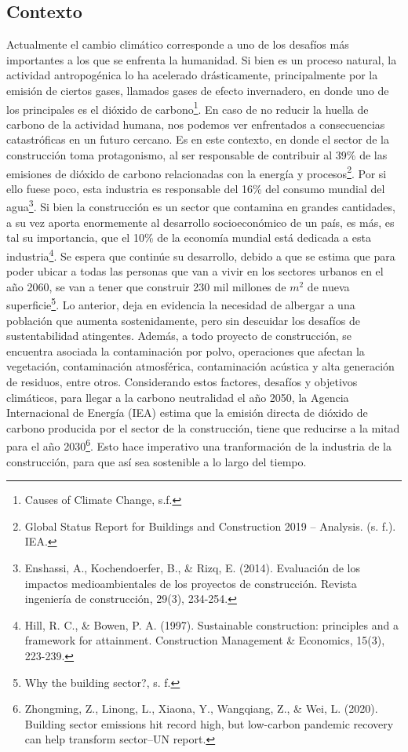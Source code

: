 \documentclass[letterpaper]{article}
\begin{document}
\subsection{Contexto}
\justify
Actualmente el cambio climático corresponde a uno de los desafíos más importantes a los que se enfrenta la humanidad. Si bien es un proceso natural,
la actividad antropogénica lo ha acelerado drásticamente, principalmente por la emisión de ciertos gases, llamados gases de efecto invernadero,
en donde uno de los principales es el dióxido de carbono\footnote{Causes of Climate Change, s.f.}. En caso de no reducir la huella de carbono de la actividad humana,
nos podemos ver enfrentados a consecuencias catastróficas en un futuro cercano. 
\newline \newline
Es en este contexto, en donde el sector de la construcción toma protagonismo, al ser responsable de contribuir al 39\% de las emisiones de dióxido
de carbono relacionadas con la energía y procesos\footnote{Global Status Report for Buildings and Construction 2019 – Analysis. (s. f.). IEA.}. Por si ello fuese poco, esta
industria es responsable del 16\% del consumo mundial del agua\footnote{Enshassi, A., Kochendoerfer, B., \& Rizq, E. (2014). Evaluación de los impactos medioambientales de los proyectos de construcción. Revista ingeniería de construcción, 29(3), 234-254.}. Si bien la construcción es un sector que contamina en grandes cantidades, a su vez
aporta enormemente al desarrollo socioeconómico de un país, es más, es tal su importancia, que el 10\% de la economía mundial está dedicada a esta industria\footnote{Hill, R. C., \& Bowen, P. A. (1997). Sustainable construction: principles and a framework for attainment. Construction Management \& Economics, 15(3), 223-239.}.
Se espera que continúe su desarrollo, debido a que se estima que para poder ubicar a todas las personas que van a vivir en los sectores urbanos en el año 2060, se van a
tener que construir 230 mil millones de $m^{2}$ de nueva superficie\footnote{Why the building sector?, s. f.}. Lo anterior, deja en evidencia la necesidad de albergar
a una población que aumenta sostenidamente, pero sin descuidar los desafíos de sustentabilidad atingentes. \newline \newline
Además, a todo proyecto de construcción, se encuentra asociada la contaminación por polvo, operaciones que afectan la vegetación, contaminación atmosférica, contaminación
acústica y alta generación de residuos, entre otros.\newline \newline
Considerando estos factores, desafíos y objetivos climáticos, para llegar a la carbono neutralidad el año 2050, la Agencia Internacional de Energía (IEA) estima
que la emisión directa de dióxido de carbono producida por el sector de la construcción, tiene que reducirse a la mitad para el año 2030\footnote{Zhongming, Z., Linong, L., Xiaona, Y., Wangqiang, Z., \& Wei, L. (2020). Building sector emissions hit record high, but low-carbon pandemic recovery can help transform sector–UN report.}. Esto hace imperativo una tranformación de la industria de la construcción, para que así sea sostenible a lo largo del tiempo.
\end{document}
